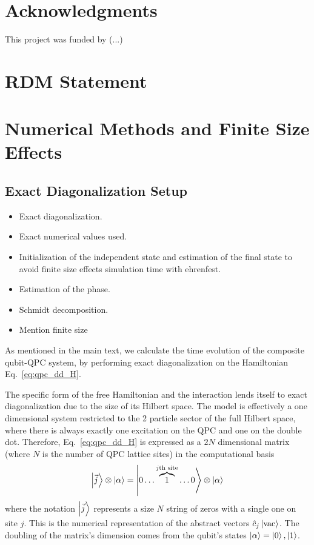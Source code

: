 \documentclass[10pt,
 amsmath,amssymb,
 aps,prb, twocolumn
]{revtex4-2}
\begin{document}
\section{Acknowledgments}

This project was funded by (...)

\section{RDM Statement}



\appendix 

\onecolumngrid 

\section{Numerical Methods and Finite Size Effects}\label{app:numerical_setup}

\subsection{Exact Diagonalization Setup}

\begin{itemize}
    \item Exact diagonalization.
    \item Exact numerical values used.
    \item Initialization of the independent state and estimation of the final state to avoid finite size effects simulation time with ehrenfest.
    \item Estimation of the phase.
    \item Schmidt decomposition.
    \item Mention finite size
\end{itemize}

As mentioned in the main text, we calculate the time evolution of the composite qubit-QPC system, by performing exact diagonalization on the Hamiltonian Eq.~\eqref{eq:qpc_dd_H}. 

The specific form of the free Hamiltonian and the interaction lends itself to exact diagonalization due to the size of its Hilbert space. The model is effectively a one dimensional system restricted to the 2 particle sector of the full Hilbert space, where there is always exactly one excitation on the QPC and one on the double dot. Therefore,  Eq.~\eqref{eq:qpc_dd_H} is expressed as a $2N$ dimensional matrix (where $N$ is the number of QPC lattice sites) in the computational basis
\begin{align}\label{eq:string_basis}
    \ket{\vec{j}}\otimes \ket{\alpha} = \ket{0\dots \overbrace{1}^{j\text{th site}} \dots0}\otimes\ket{\alpha}
\end{align}
where the notation \mbox{$\ket{\vec{j}}$} represents a size $N$ string of zeros with a single one on site $j$. This is the numerical representation of the abstract vectors \mbox{$\hat{c}_j\ket{\text{vac}}$}. The doubling of the matrix's dimension comes from the qubit's states \mbox{$\ket{\alpha} = \ket{0},\ket{1}$}.
\end{document}
